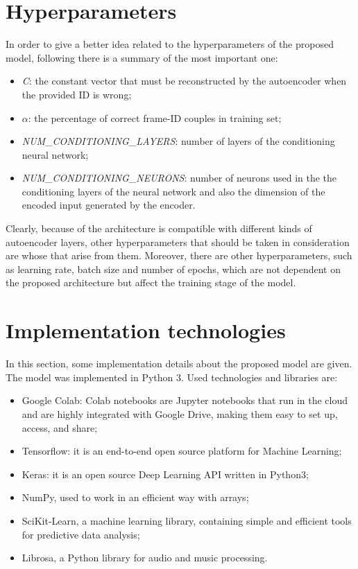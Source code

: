 \section{Hyperparameters}
In order to give a better idea related to the hyperparameters of the proposed model, following there is a summary of the most important one:
\begin{itemize}
    \item {\textit{C}: the constant vector that must be reconstructed by the autoencoder when the provided ID is wrong;}
    \item {$\alpha$: the percentage of correct frame-ID couples in training set;}
    \item {\textit{NUM\_CONDITIONING\_LAYERS}: number of layers of the conditioning neural network;}
    \item {\textit{NUM\_CONDITIONING\_NEURONS}: number of neurons used in the the conditioning layers of the neural network and also the dimension of the encoded input generated by the encoder.}
\end{itemize}
Clearly, because of the architecture is compatible with different kinds of autoencoder layers, other hyperparameters that should be taken in consideration are whose that arise from them. Moreover, there are other hyperparameters, such as learning rate, batch size and number of epochs, which are not dependent on the proposed architecture but affect the training stage of the model.

\section{Implementation technologies}
In this section, some implementation details about the proposed model are given. The model was implemented in Python 3. Used technologies and libraries are:
\begin{itemize}
    \item {Google Colab: Colab notebooks are Jupyter notebooks that run in the cloud and are highly integrated with Google Drive, making them easy to set up, access, and share;}
    \item {Tensorflow: it is an end-to-end open source platform for Machine Learning;}
    \item {Keras: it is an open source Deep Learning API written in Python3;}
    \item {NumPy, used to work in an efficient way with arrays;}
    \item {SciKit-Learn, a machine learning library, containing simple and efficient tools for predictive data analysis;}
    \item {Librosa, a Python library for audio and music processing.}
\end{itemize}

